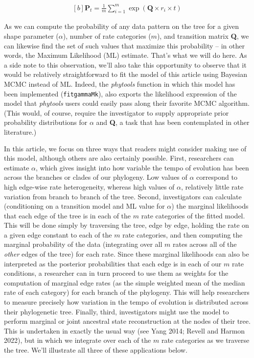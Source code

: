 \documentclass[fleqn,10pt,lineno]{wlpeerj} %
\begin{document}
\begin{equation}
\begin{aligned}[b]
\mathbf{P}_{t} = \frac{1}{m} \displaystyle\sum_{i=1}^{m} \exp(\mathbf{Q} \times r_{i} \times t)
\end{aligned}
\end{equation}

As we can compute the probability of any data pattern on the tree for a given shape parameter (\(\alpha\)), number of rate categories (\(m\)), and transition matrix \textbf{Q}, we can likewise find the set of such values that maximize this probability -- in other words, the Maximum Likelihood (ML) estimate. That's what we will do here. As a side note to this observation, we'll also take this opportunity to observe that it would be relatively straightforward to fit the model of this article using Bayesian MCMC instead of ML. Indeed, the \emph{phytools} function in which this model has been implemented (\texttt{fitgammaMk}), also exports the likelihood expression of the model that \emph{phytools} users could easily pass along their favorite MCMC algorithm. (This would, of course, require the investigator to supply appropriate prior probability distributions for \(\alpha\) and \textbf{Q}, a task that has been contemplated in other literature.)

In this article, we focus on three ways that readers might consider making use of this model, although others are also certainly possible. First, researchers can estimate \(\alpha\), which gives insight into how variable the tempo of evolution has been across the branches or clades of our phylogeny. Low values of \(\alpha\) correspond to high edge-wise rate heterogeneity, whereas high values of \(\alpha\), relatively little rate variation from branch to branch of the tree. Second, investigators can calculate (conditioning on a transition model and ML value for \(\alpha\)) the marginal likelihoods that each edge of the tree is in each of the \(m\) rate categories of the fitted model. This will be done simply by traversing the tree, edge by edge, holding the rate on a given edge constant to each of the \(m\) rate categories, and then computing the marginal probability of the data (integrating over all \(m\) rates across all of the \emph{other} edges of the tree) for each rate. Since these marginal likelihoods can also be interpreted as the posterior probabilities that each edge is in each of our \(m\) rate conditions, a researcher can in turn proceed to use them as weights for the computation of marginal edge rates (as the simple weighted mean of the median rate of each category) for each branch of the phylogeny. This will help researchers to measure precisely how variation in the tempo of evolution is distributed across their phylogenetic tree. Finally, third, investigators might use the model to perform marginal or joint ancestral state reconstruction at the nodes of their tree. This is undertaken in exactly the usual way (see Yang 2014; Revell and Harmon 2022), but in which we integrate over each of the \(m\) rate categories as we traverse the tree. We'll illustrate all three of these applications below.
\end{document}
